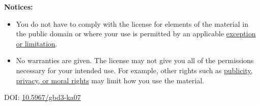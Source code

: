 \begin{flushleft}
\textbf{Notices:}

\begin{itemize}
\tightlist
\item You do not have to comply with the license for elements of the material in the public domain or where your use is permitted by an applicable \href{https://creativecommons.org/licenses/by/4.0/\#ref-exception-or-limitation}{exception or limitation}.\\
\item No warranties are given. The license may not give you all of the permissions necessary for your intended use. For example, other rights such as \href{https://creativecommons.org/licenses/by/4.0/\#ref-publicity-privacy-or-moral-rights}{publicity, privacy, or moral rights} may limit how you use the material.
\end{itemize}

\vspace{5mm}
DOI: \href{https://doi.org/10.5967/gbd3-ka07}{10.5967/gbd3-ka07}
\end{flushleft}

